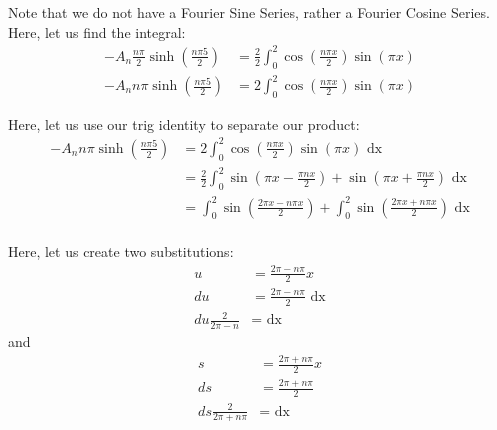 \begin{enumerate}
Note that we do not have a Fourier Sine Series, rather a Fourier Cosine Series. Here, let us find the integral:
%
\begin{align}
  - A_n \frac{n \pi}{2} \sinh\left( \frac{n \pi 5}{2} \right)
  & = \frac{2}{2} \int^2_0 \cos\left(\frac{n \pi x}{2}\right)\sin(\pi x)\\
  - A_n n \pi \sinh\left( \frac{n \pi 5}{2} \right)
  & =
  2 \int^2_0 \cos\left(\frac{n \pi x}{2}\right)\sin(\pi x)
\end{align}

Here, let us use our trig identity to separate our product:
%
\begin{align}
  - A_n n \pi \sinh\left( \frac{n \pi 5}{2} \right)
  & = 2 \int^2_0
  \cos\left(\frac{n \pi x}{2}\right)\sin(\pi x)
  \text{ dx}\\
  & = \frac{2}{2} \int^2_0
  \sin\left(\pi x - \frac{\pi n x}{2}\right) + \sin\left(\pi x +
  \frac{\pi n x}{2}\right)
  \text{ dx}\\
  & = \int^2_0
  \sin\left(\frac{2 \pi x - n \pi x}{2}\right) +
  \int^2_0 \sin\left(\frac{2
  \pi x + n \pi x}{2}\right)
  \text{ dx}\\
\end{align}

Here, let us create two substitutions:
%
\begin{align}
  u & = \frac{2 \pi - n \pi}{2}x\\
  du & = \frac{2 \pi - n \pi}{2} \text{ dx}\\
  du \frac{2}{2 \pi - n} & = \text{ dx}
\end{align}
 and
\begin{align}
  s & = \frac{2 \pi + n \pi}{2} x\\
  ds & = \frac{2 \pi + n \pi}{2}\\
  ds \frac{2}{2 \pi + n \pi} & = \text{ dx}
\end{align}


\end{enumerate}
